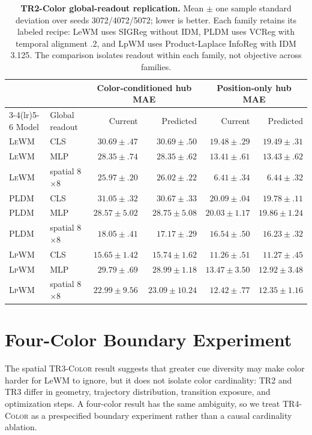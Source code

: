 \documentclass{article}
\newcommand{\trthree}{\textsc{TR3-Color}}
\newcommand{\trfour}{\textsc{TR4-Color}}
\newcommand{\lewm}{\textsc{LeWM}}
\newcommand{\pldm}{\textsc{PLDM}}
\newcommand{\lpwm}{\textsc{LpWM}}
\begin{document}
\begin{table}[t]
\centering
\small
\setlength{\tabcolsep}{4.2pt}
\begin{tabular}{@{}llrrrr@{}}
\toprule
& & \multicolumn{2}{c}{Color-conditioned hub MAE} &
\multicolumn{2}{c}{Position-only hub MAE} \\
\cmidrule(lr){3-4}\cmidrule(lr){5-6}
Model & Global readout & Current & Predicted & Current & Predicted \\
\midrule
\lewm{} & CLS & $30.69\pm.47$ & $30.69\pm.50$ & $19.48\pm.29$ & $19.49\pm.31$ \\
\lewm{} & MLP & $28.35\pm.74$ & $28.35\pm.62$ & $13.41\pm.61$ & $13.43\pm.62$ \\
\lewm{} & spatial 8$\times$8 & $25.97\pm.20$ & $26.02\pm.22$ & $6.41\pm.34$ & $6.44\pm.32$ \\
\midrule
\pldm{} & CLS & $31.05\pm.32$ & $30.67\pm.33$ & $20.09\pm.04$ & $19.78\pm.11$ \\
\pldm{} & MLP & $28.57\pm5.02$ & $28.75\pm5.08$ & $20.03\pm1.17$ & $19.86\pm1.24$ \\
\pldm{} & spatial 8$\times$8 & $18.05\pm.41$ & $17.17\pm.29$ & $16.54\pm.50$ & $16.23\pm.32$ \\
\midrule
\lpwm{} & CLS & $15.65\pm1.42$ & $15.74\pm1.62$ & $11.26\pm.51$ & $11.27\pm.45$ \\
\lpwm{} & MLP & $29.79\pm.69$ & $28.99\pm1.18$ & $13.47\pm3.50$ & $12.92\pm3.48$ \\
\lpwm{} & spatial 8$\times$8 & $22.99\pm9.56$ & $23.09\pm10.24$ & $12.42\pm.77$ & $12.35\pm1.16$ \\
\bottomrule
\end{tabular}
\caption{\textbf{TR2-Color global-readout replication.} Mean $\pm$ one sample
standard deviation over seeds 3072/4072/5072; lower is better.  Each family
retains its labeled recipe: LeWM uses SIGReg without IDM, PLDM uses VCReg with
temporal alignment .2, and LpWM uses Product-Laplace InfoReg with IDM 3.125.
The comparison isolates readout within each family, not objective across
families.}
\label{tab:aggregation-replication}
\end{table}

\section{Four-Color Boundary Experiment}

The spatial \trthree{} result suggests that greater cue diversity may make
color harder for LeWM to ignore, but it does not isolate color cardinality:
TR2 and TR3 differ in geometry, trajectory distribution, transition exposure,
and optimization steps.  A four-color result has the same ambiguity, so we
treat \trfour{} as a prespecified boundary experiment rather than a causal
cardinality ablation.
\end{document}
